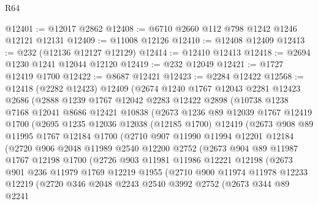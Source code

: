 \begin{lexlean}{R64}
\begin{coremodule}
@12401 := @12017 @2862
@12408 := @6710 @2660 @112 @798 @1242 @1246 @12121 @12131
@12409 := @11008 @12126
@12410 := @12408 @12409
@12413 := @232 (@12136 @12127 @12129)
@12414 := @12410 @12413
@12418 := @2694 @1230 @1241 @12044 @12120
@12419 := @232 @12049
@12421 := @1727 @12419 @1700
@12422 := @8687 @12421
@12423 := @2284 @12422
@12568 := @12418
    (@2282 @12423)
    @12409
    (@2674
      @1240
      @1767
      @12043
      @2281
      @12423
      @2686
      (@2888
        @1239
        @1767
        @12042
        @2283
        @12422
        @2898
        (@10738
          @1238
          @7168
          @12041
          @8686
          @12421
          @10838
          (@2673
            @1236
            @89
            @12039
            @1767
            @12419
            @1700
            (@2695
              @1235
              @12036
              @12038
              (@12185 @1700)
              @12419
              (@2673
                @908
                @89
                @11995
                @1767
                @12184
                @1700
                (@2710
                  @907
                  @11990
                  @11994
                  @12201
                  @12184
                  (@2720
                    @906
                    @2048
                    @11989
                    @2540
                    @12200
                    @2752
                    (@2673
                      @904
                      @89
                      @11987
                      @1767
                      @12198
                      @1700
                      (@2726
                        @903
                        @11981
                        @11986
                        @12221
                        @12198
                        (@2673
                          @901
                          @236
                          @11979
                          @1769
                          @12219
                          @1955
                          (@2710
                            @900
                            @11974
                            @11978
                            @12233
                            @12219
                            (@2720
                              @346
                              @2048
                              @2243
                              @2540
                              @3992
                              @2752
                              (@2673
                                @344
                                @89
                                @2241

\end{coremodule}
\end{lexlean}
